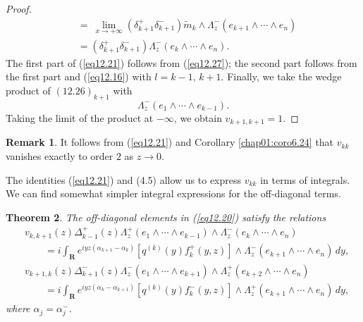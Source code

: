 \documentclass{surv-l}
\theoremstyle{plain}
\newtheorem{theorem}{Theorem}[section]
\theoremstyle{definition}
\newtheorem{remark}[theorem]{Remark}
\numberwithin{equation}{chapter}
\begin{document}
\begin{proof}
\begin{align}
&=\ \lim_{x\rightarrow+\infty}(\delta_{k+1}^{+}\delta_{k+1}^{-})\tilde{m}_{k}\wedge\Lambda_{z}^{-}(e_{k+1}\wedge\cdots\wedge e_{n})\\\nonumber
&=(\delta_{k+1}^{+}\delta_{k+1}^{-})\Lambda_{z}^{-}(e_{k}\wedge\cdots\wedge e_{n}).\nonumber
\end{align}
The first part of (\ref{eq12.21}) follows from (\ref{eq12.27}); the second part follows from the first part and (\ref{eq12.16}) with $l=k-1,\, k+1$. Finally, we take the wedge product of $(12.26)_{k+1}$ with
\begin{equation*}
\Lambda_{z}^{-}(e_{1}\wedge\cdots \wedge e_{k-1}).
\end{equation*}
Taking the limit of the product at $-\infty$, we obtain $v_{k+1,k+1}=1$.
\end{proof}
\setcounter{theorem}{27}
\begin{remark}\label{rem12.28}
It follows from (\ref{eq12.21}) and Corollary \ref{chap01:coro6.24} that $v_{kk}$ vanishes exactly to order $2$ as $z\rightarrow 0$.

The identities (\ref{eq12.21}) and (4.5) allow us to express $v_{kk}$ in terms of integrals. We can find somewhat simpler integral expressions for the off-diagonal terms.
\end{remark}
\begin{theorem}\label{thm12.29}
The off-diagonal elements in \emph{(\ref{eq12.20})} satisfy the relations
\setcounter{equation}{29}
\begin{align}\label{eq12.30}
& v_{k,k+1}(z)\Delta_{k-1}^{+}(z)\Lambda_{z}^{+}(e_{1}\wedge\cdots\wedge e_{k-1})\wedge\Lambda_{z}^{-}(e_{k}\wedge\cdots\wedge e_{n})\\
&\quad\quad =i\int_{\mathbf{R}}e^{iyz(\alpha_{k+1}-\alpha_{k})}[q^{(k)}(y)f_{k}^{+}(y, z)]\wedge\Lambda_{z}^{-}(e_{k+1}\wedge\cdots\wedge e_{n})\,dy,\nonumber\\
& v_{k+1, k}(z)\Delta_{k+1}^{-}(z)\Lambda_{z}^{-}(e_{1}\wedge\cdots\wedge e_{k+1})\wedge\Lambda_{z}^{+}(e_{k+2}\wedge\cdots \wedge e_{n})\label{eq12.31}\\
&\quad\quad=i\int_{\mathbf{R}}e^{iyz(\alpha_{k}-\alpha_{k+1})}[q^{(k)}(y)f_{k}^{-}(y, z)]\wedge\Lambda_{z}^{+}(e_{k+1}\wedge\cdots\wedge e_{n})\,dy,\nonumber
\end{align}
where $\alpha_{j}=\alpha_{j}^{-}$.
\end{theorem}
\end{document}
